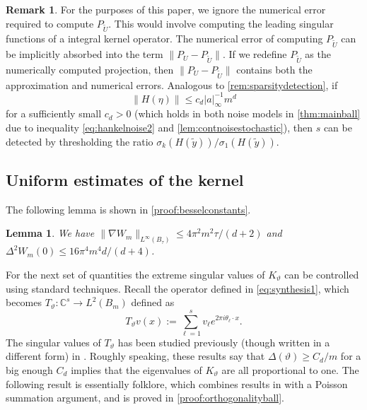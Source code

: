 \documentclass[11pt]{article}
\newtheorem{lemma}[theorem]{Lemma}
\theoremstyle{definition}
\newtheorem{remark}{Remark}[section]
\numberwithin{theorem}{section}
\numberwithin{lemma}{section}
\numberwithin{equation}{section}
\def\C{\mathbb{C}}
\renewcommand{\tilde}{\widetilde}
\numberwithin{equation}{section}
\begin{document}
	\begin{remark}
	    \label{rem:sparsitydection2}
        For the purposes of this paper, we ignore the numerical error required to compute $P_{\tilde U}$. This would involve computing the leading singular functions of a integral kernel operator. The numerical error of computing $P_{\tilde U}$ can be implicitly absorbed into the term $\|P_U-P_{\tilde U}\|$. If we redefine $P_{\tilde U}$ as the numerically computed projection, then $\|P_U-P_{\tilde U}\|$ contains both the approximation and numerical errors. Analogous to \cref{rem:sparsitydetection}, if 
        $$
        \|H(\eta)\|\leq c_d |a|_\infty^{-1} m^d
        $$ 
        for a sufficiently small $c_d>0$ (which holds in both noise models in \cref{thm:mainball} due to inequality \eqref{eq:hankelnoise2} and \cref{lem:contnoisestochastic}), then $s$ can be detected by thresholding the ratio $\sigma_k(H(\tilde y))/\sigma_1(H(\tilde y))$.
	\end{remark}


	\subsection{Uniform estimates of the kernel}
	\label{sec:verification2}
	
	The following lemma is shown in \cref{proof:besselconstants}.	
	\begin{lemma}\label{lem:besselconstants} 
		We have $\|\nabla W_m\|_{L^\infty(B_\tau)} \leq 4\pi^2 m^2 \tau/(d+2)$ and $\Delta^2 W_m(0)\leq 16\pi^4 m^4 d/(d+4)$. 
	\end{lemma}
	
	For the next set of quantities the extreme singular values of $K_{\vartheta}$ can be controlled using standard techniques. Recall the operator defined in  \eqref{eq:synthesis1}, which becomes $T_\vartheta\colon \C^s\to L^2(B_m)$ defined as
	\begin{equation}
		\label{eq:Fourierball}
		T_\vartheta v(x) := \sum_{\ell=1}^s v_\ell e^{2\pi i \theta_\ell\cdot x}. 
	\end{equation}
	The singular values of $T_\vartheta$ has been studied previously (though written in a different form) in \cite{holt1996beurling,gonccalves2018note,li2025nonharmonic}. Roughly speaking, these results say that $\Delta(\vartheta)\geq C_d/m$ for a big enough $C_d$ implies that the eigenvalues of $K_\vartheta$ are all proportional to one. The following result is essentially folklore, which combines results in \cite{holt1996beurling} with a Poisson summation argument, and is proved in \cref{proof:orthogonalityball}. 
\end{document}
